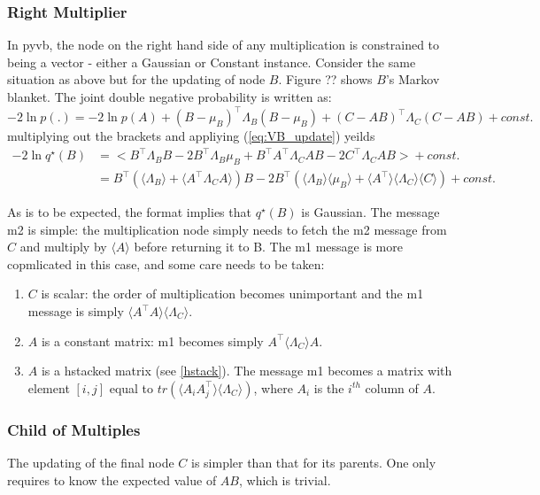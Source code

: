 \documentclass{article}
\newcommand{\const}{\textit{const.}}
\newcommand{\qs}{q^\star}
\newcommand{\<}{\langle}
\renewcommand{\>}{\rangle}
\newcommand{\trace}{\textit{tr}}
\begin{document}
\subsubsection{Right Multiplier}
In pyvb, the node on the right hand side of any multiplication is constrained to being a vector - either a Gaussian or Constant instance.  
Consider the same situation as above but for the updating of node $B$.  Figure {??} shows $B$'s Markov blanket. The joint double negative probability is written as:
\begin{equation}
-2\ln p(.) = -2\ln p(A) + (B-\mu_B)^\top\Lambda_B(B-\mu_B) + (C-AB)^\top\Lambda_C(C-AB)+\const
\end{equation}
multiplying out the brackets and appliying (\ref{eq:VB_update}) yeilds
\begin{equation}
\begin{split}
-2\ln \qs (B) &= \big< B^\top\Lambda_BB -2B^\top\Lambda_B\mu_B +  B^\top A^\top \Lambda_C AB -2 C^\top \Lambda_C AB \big>+ \const\\
& = B^\top(\<\Lambda_B\> + \<A^\top \Lambda_C A\>)B -2B^\top(\<\Lambda_B\>\<\mu_B\> +\<A^\top\> \<\Lambda_C\>\<C\>) + \const
\end{split}
\end{equation}

As is to be expected, the format implies that $\qs(B)$ is Gaussian.  The message m2 is simple: the multiplication node simply needs to fetch the m2 message from $C$ and multiply by $\<A\>$ before returning it to B.  The m1 message is more copmlicated in this case, and some care needs to be taken:
\begin{enumerate}
\item $C$ is scalar: the order of multiplication becomes unimportant and the m1 message is simply $\<A^\top A\>\<\Lambda_C\>$.
\item $A$ is a constant matrix: m1 becomes simply $A^\top \<\Lambda_C\>A$.  
\item $A$ is a hstacked matrix (see \ref{hstack}). The message m1 becomes a matrix with element $[i,j]$ equal to $\trace(\<A_iA_j^\top\>\<\Lambda_C\>)$, where $A_i$ is the $i^{th}$ column of $A$.    
\end{enumerate}

\subsubsection{Child of Multiples}
The updating of the final node $C$ is simpler than that for its parents. One only requires to know the expected value of $AB$, which is trivial.
\end{document}
